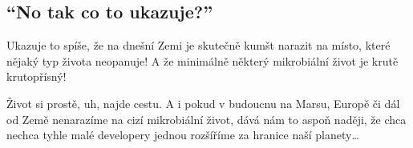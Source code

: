 \documentclass[main.tex]{subfiles}
\begin{document}
\subsection*{\enquote{No tak co to ukazuje?}}
Ukazuje to spíše, že na dnešní Zemi je skutečně kumšt narazit na místo, které nějaký typ života neopanuje! A že minimálně některý mikrobiální život je krutě krutopřísný!\par
Život si prostě, uh, najde cestu. A i pokud v budoucnu na Marsu, Europě či dál od Země nenarazíme na cizí mikrobiální život, dává nám to aspoň naději, že chca nechca tyhle malé developery jednou rozšíříme za hranice naší planety…
\newpage
\end{document}
